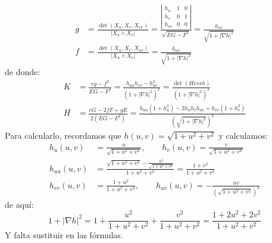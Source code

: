 \documentclass[12pt]{article}
\begin{document}
\begin{ejercicio}
\begin{enumerate}[label=\alph*)]
\begin{align*}
                    g &= \frac{\det(X_u,X_v,X_{vv})}{|X_u\land X_v|} = \frac{\left|\begin{array}{ccc}
                        h_u & 1 & 0 \\
                        h_v & 0 & 1 \\
                        h_{vv} & 0 & 0
                    \end{array}\right|}{\sqrt{EG-F^2}} = \frac{h_{vv}}{\sqrt{1+|\nabla h|^2}} \\
                            f &= \frac{\det(X_u,X_v,X_{uv})}{|X_u\land X_v|} = \frac{h_{uv}}{\sqrt{1+|\nabla h|^2}}
                \end{align*}
                de donde:
                \begin{align*}
                    K &= \frac{eg-f^2}{EG-F^2} = \frac{h_{uu}h_{vv}-h_{uv}^2}{{(1+|\nabla h|^2)}^{2}} = \frac{\det(Hess h)}{{(1+|\nabla h|^2)}^{2}} \\
                    H &= \frac{eG-2fF+gE}{2(EG-F^2)} = \frac{h_{uu}(1+h_u^2)-2h_uh_vh_{uv}+h_{vv}(1+h_v^2)}{{\left(\sqrt{1+|\nabla h|^2}\right)}^{3}}
                \end{align*}
                Para calcularlo, recordamos que $h(u,v) = \sqrt{1+u^2+v^2}$ y calculamos:
                \begin{align*}
                    h_u(u,v) &= \frac{u}{\sqrt{1+u^2+v^2}},\qquad  h_v(u,v) = \frac{v}{\sqrt{1+u^2+v^2}} \\
                    h_{uu}(u,v) &= \frac{\sqrt{1+u^2+v^2}-\frac{u^2}{\sqrt{1+u^2+v^2}}}{1+u^2+v^2} = \frac{1+v^2}{1+u^2+v^2} \\
                    h_{vv}(u,v) &= \frac{1+u^2}{1+u^2+v^2}, \qquad 
                    h_{uv}(u,v) = -\frac{uv}{{\left(\sqrt{1+u^2+v^2}\right)}^{3}}
                \end{align*}
                de aquí:
                \begin{equation*}
                    1+|\nabla h|^2 = 1 + \frac{u^{2}}{1+u^2+v^2} + \frac{v^2}{1+u^2+v^2} = \frac{1+2u^2 + 2v^2}{1+u^2+v^2}
                \end{equation*}
                Y falta sustituir en las fórmulas.
        \end{enumerate}
    \end{ejercicio}
\end{document}
